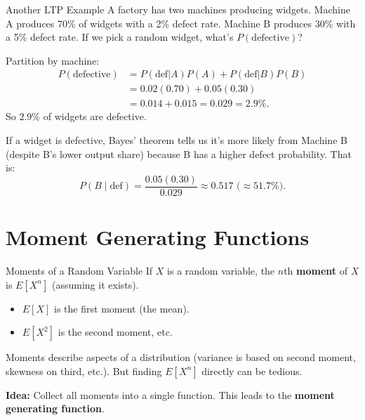 \documentclass[aspectratio=169,11pt]{beamer} %
\begin{document}
\begin{frame}{Another LTP Example}
A factory has two machines producing widgets. Machine A produces 70\% of widgets with a 2\% defect rate. Machine B produces 30\% with a 5\% defect rate. If we pick a random widget, what's $P(\text{defective})$? \newline

Partition by machine:
\begin{align*}
P(\text{defective}) &= P(\text{def}|A)P(A) + P(\text{def}|B)P(B) \\
&= 0.02(0.70) + 0.05(0.30) \\
&= 0.014 + 0.015 = 0.029 = 2.9\%.
\end{align*}
So $2.9\%$ of widgets are defective. \newline

If a widget is defective, Bayes' theorem tells us it's more likely from Machine B (despite B's lower output share) because B has a higher defect probability. That is:
\[ P(B \mid \text{def}) = \frac{0.05(0.30)}{0.029} \approx 0.517 \text{ (}\approx 51.7\%\text{)}. \]
\end{frame}

\section{Moment Generating Functions}

\begin{frame}{Moments of a Random Variable}
If $X$ is a random variable, the $n$th \textbf{moment} of $X$ is $E[X^n]$ (assuming it exists). 
\begin{itemize}
    \item $E[X]$ is the first moment (the mean).
    \item $E[X^2]$ is the second moment, etc.
\end{itemize}

Moments describe aspects of a distribution (variance is based on second moment, skewness on third, etc.). But finding $E[X^n]$ directly can be tedious. \newline

\textbf{Idea:} Collect all moments into a single function. This leads to the \textbf{moment generating function}.
\end{frame}
\end{document}
